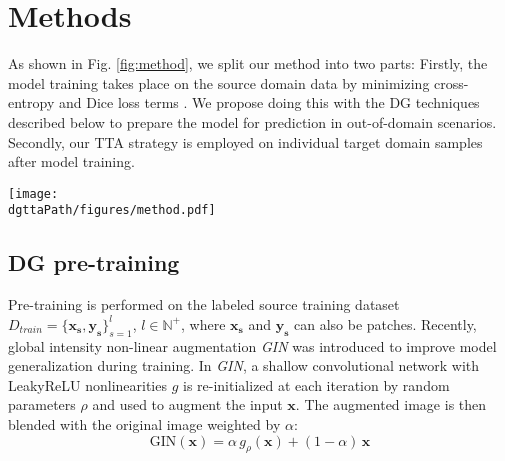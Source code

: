 



\section{Methods}
    \label{sec:method_dgtta}
    As shown in Fig. \ref{fig:method}, we split our method into two parts: Firstly, the model training takes place on the source domain data by minimizing cross-entropy and Dice loss terms \cite{isensee2021nnu}. We propose doing this with the DG techniques described below to prepare the model for prediction in out-of-domain scenarios. Secondly, our TTA strategy is employed on individual target domain samples after model training.
    \begin{figure*}
        \centerline{\texttt{[image: \\dgttaPath/figures/method.pdf]}}
        \caption{Left: Model pre-training with source domain data. We propose to use \emph{GIN}, \emph{MIND} or their combination \emph{GIN+MIND} in this step. Right: \emph{DG-TTA} method applied in the target data domain. Two differently augmented versions of the same input are passed through the pre-trained segmentation network. The network weights are then optimized supervising the predictions with a Dice loss steering the network to produce consistent predictions.}
        \label{fig:method}
    \end{figure*}

    \subsection{DG pre-training}
    Pre-training is performed on the labeled source training dataset $D_{train}=\{\mathbf{x_s},\mathbf{y_s}\}_{s=1}^{l}$, $l\in\mathbb{N}^+$, where $\mathbf{x_s}$ and $\mathbf{y_s}$ can also be patches.
    Recently, global intensity non-linear augmentation \emph{GIN} \cite{ouyang2022causality} was introduced to improve model generalization during training.
    In \emph{GIN}, a shallow convolutional network with LeakyReLU nonlinearities $g$ is re-initialized at each iteration by random parameters $\rho$ and used to augment the input $\mathbf{x}$.
    The augmented image is then blended with the original image weighted by $\alpha$:
    \begin{equation}
        \text{GIN}(\mathbf{x}) = \alpha\,g_\rho(\mathbf{x}) + (1-\alpha)\,\mathbf{x}
    \end{equation}

